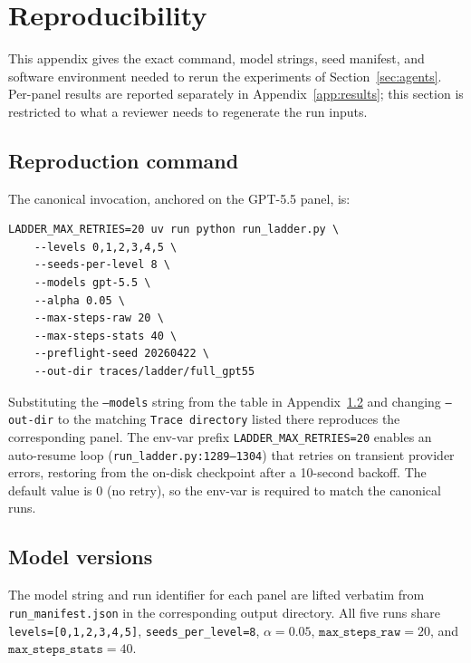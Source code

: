 \section{Reproducibility}
\label{app:repro}

This appendix gives the exact command, model strings, seed manifest, and software environment needed to rerun the experiments of Section~\ref{sec:agents}. Per-panel results are reported separately in Appendix~\ref{app:results}; this section is restricted to what a reviewer needs to regenerate the run inputs.

\subsection{Reproduction command}
\label{app:repro:command}

The canonical invocation, anchored on the GPT-5.5 panel, is:

\begin{verbatim}
LADDER_MAX_RETRIES=20 uv run python run_ladder.py \
    --levels 0,1,2,3,4,5 \
    --seeds-per-level 8 \
    --models gpt-5.5 \
    --alpha 0.05 \
    --max-steps-raw 20 \
    --max-steps-stats 40 \
    --preflight-seed 20260422 \
    --out-dir traces/ladder/full_gpt55
\end{verbatim}

Substituting the \texttt{--models} string from the table in Appendix~\ref{app:repro:models} and changing \texttt{--out-dir} to the matching \texttt{Trace directory} listed there reproduces the corresponding panel. The env-var prefix \texttt{LADDER\_MAX\_RETRIES=20} enables an auto-resume loop (\texttt{run\_ladder.py:1289--1304}) that retries on transient provider errors, restoring from the on-disk checkpoint after a 10-second backoff. The default value is $0$ (no retry), so the env-var is required to match the canonical runs.

\subsection{Model versions}
\label{app:repro:models}

The model string and run identifier for each panel are lifted verbatim from \texttt{run\_manifest.json} in the corresponding output directory. All five runs share \texttt{levels=[0,1,2,3,4,5]}, \texttt{seeds\_per\_level=8}, $\alpha=0.05$, $\texttt{max\_steps\_raw}=20$, and $\texttt{max\_steps\_stats}=40$.

